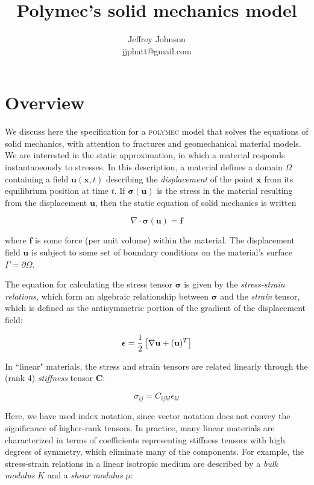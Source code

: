 \documentclass[12pt]{article}
\title{Polymec's solid mechanics model}
\author{Jeffrey Johnson \\ 
jjphatt@gmail.com}
\newcommand{\labelSec}[1]{\label{sec:#1}}
\newcommand{\labelEq}[1]{\label{eq:#1}}
\newcommand{\polymec}{\textsc{polymec} }
\renewcommand{\vec}[1]{\mathbf{#1}}
\newcommand{\tens}[1]{\mathbf{#1}}
\newcommand{\diverg}[1]{\nabla\cdot#1}
\newcommand{\grad}[1]{\nabla#1}
\newcommand{\half}{\small\frac{1}{2}}
\newcommand{\stress}{\boldsymbol\sigma}
\newcommand{\strain}{\boldsymbol\epsilon}
\begin{document}
\maketitle

% 

\section{Overview}\labelSec{Overview}

We discuss here the specification for a \polymec model that solves the equations 
of solid mechanics, with attention to fractures and geomechanical material models.
We are interested in the static approximation, in which a material responds instantaneously
to stresses. In this description, a material defines a domain $\Omega$ containing a 
field $\vec{u}(\vec{x}, t)$ describing the {\em displacement} of the point $\vec{x}$ from
its equilibrium position at time $t$. If $\stress(\vec{u})$ is the stress in the 
material resulting from the displacement $\vec{u}$, then the static equation of solid 
mechanics is written

\begin{equation}
\diverg{\stress(\vec{u})} = \vec{f} \labelEq{staticSolidMechEq}
\end{equation}

\noindent
where $\vec{f}$ is some force (per unit volume) within the material. The displacement 
field $\vec{u}$ is subject to some set of boundary conditions on the material's surface 
$\Gamma = \partial\Omega$.

The equation for calculating the stress tensor $\stress$ is given by the 
{\em stress-strain relations}, which form an algebraic relationship between 
$\stress$ and the {\em strain} tensor, which is defined as the antisymmetric 
portion of the gradient of the displacement field:

\begin{equation}
\strain = \half\left[\grad{\vec{u}} + (\vec{u})^T\right]
\end{equation}

\noindent
In ``linear" materials, the stress and strain tensors are related linearly through 
the (rank 4) {\em stiffness} tensor $\tens{C}$:

\begin{equation}
\sigma_{ij} = C_{ijkl} \epsilon_{kl}
\end{equation}

\noindent
Here, we have used index notation, since vector notation does not convey the significance 
of higher-rank tensors. In practice, many linear materials are characterized in terms 
of coefficients representing stiffness tensors with high degrees of symmetry, which eliminate
many of the components. For example, the stress-strain relations in a linear  isotropic medium 
are described by a {\em bulk modulus} $K$ and a {\em shear modulus} $\mu$:
\end{document}
